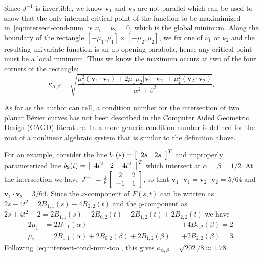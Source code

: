 Since \(J^{-1}\) is invertible, we know \(\bm{v}_1\) and \(\bm{v}_2\) are
not parallel which can be used to show that the only internal critical
point of the function to be maximimized in~\eqref{eq:intersect-cond-num}
is \(\nu_1 = \nu_2 = 0\), which is the global minimum. Along the boundary of
the rectangle
\(\left[-\mu_1, \mu_1\right] \times \left[-\mu_2, \mu_2\right]\),
we fix one of \(\nu_1\) or \(\nu_2\) and the resulting univariate function is
an up-opening parabola, hence any critical point must be a local
minimum. Thus we know the maximum occurs at two of the four corners of the
rectangle:
\begin{equation}\label{eq:intersect-cond-num-too}
\kappa_{\alpha, \beta} = \sqrt{\frac{\mu_1^2
  \left(\bm{v}_1 \cdot \bm{v}_1\right) +
  2 \mu_1 \mu_2 \left|\bm{v}_1 \cdot \bm{v}_2\right| +
  \mu_2^2 \left(\bm{v}_2 \cdot \bm{v}_2\right)}{\alpha^2 + \beta^2}}.
\end{equation}

As far as the author can tell,
a condition number for the intersection of two planar B\'{e}zier curves
has not been described in the Computer Aided Geometric Design (CAGD)
literature. In \cite[Chapter~25, Equation 25.11]{Higham2002}
a more generic condition number is defined for the root of a nonlinear
algebraic system that is similar to the definition above.

For an example, consider the line
\(b_1(s) = \left[ \begin{array}{c c} 2s & 2s \end{array}\right]^T\)
and improperly parameterized line
\(b_2(t) = \left[ \begin{array}{c c} 4t^2 & 2 - 4t^2
\end{array}\right]^T\) which intersect at \(\alpha = \beta = 1/2\).
At the intersection we have \(J^{-1} = \frac{1}{8}
\left[ \begin{array}{c c} 2 & 2 \\ -1 & 1 \end{array}\right]\),
so that \(\bm{v}_1 \cdot \bm{v}_1 = \bm{v}_2 \cdot \bm{v}_2 =
5/64\) and \(\bm{v}_1 \cdot \bm{v}_2 = 3/64\). Since the
\(x\)-component of \(F(s, t)\) can be written as
\(2s - 4t^2 = 2 B_{1, 1}(s) - 4 B_{2, 2}(t)\) and the
\(y\)-component as \(2s + 4t^2 - 2 = 2 B_{1, 1}(s) - 2 B_{0, 2}(t)
- 2 B_{1, 2}(t) + 2 B_{2, 2}(t)\) we have
\begin{alignat}{2}
\mu_1 &= 2 B_{1, 1}(\alpha) &&+ 4 B_{2, 2}(\beta) = 2 \\
\mu_2 &= 2 B_{1, 1}(\alpha) + 2 B_{0, 2}(\beta) +
  2 B_{1, 2}(\beta) &&+ 2 B_{2, 2}(\beta) = 3.
\end{alignat}
Following~\eqref{eq:intersect-cond-num-too}, this gives
\(\kappa_{\alpha, \beta} = \sqrt{202}/8 \approx 1.78\).

